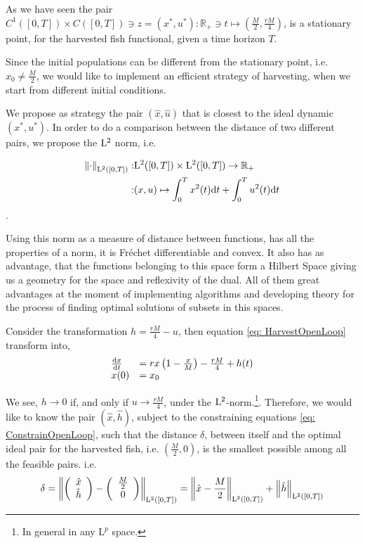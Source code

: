 As we have seen the pair $C^1([0,T])\times C([0,T]) \ni z=(x^*,u^*): \mathbb{R_+}\ni t \mapsto \left(\frac{M}{2}, \frac{rM}{4}\right)$, is a stationary point, for the harvested fish functional, given a time horizon $T$. 

Since the initial populations can be different from the stationary point, i.e. $x_0\neq\frac{M}{2}$, we would like to implement an efficient strategy of harvesting, when we start from different initial conditions.

We propose as strategy the pair $(\hat{x}, \hat{u})$ that is closest to the ideal dynamic $(x^*, u^*)$. In order to do a comparison between the distance of two different pairs, we propose the $\mathrm{L}^2$ norm, i.e. 

\begin{align}
	\left\lVert \cdot \right\rVert_{\mathrm{L}^2([0,T])}:& \mathrm{L}^2([0,T])\times \mathrm{L}^2([0,T])\rightarrow \mathbb{R_+}\\
	:& (x, u)\mapsto \int_{0}^T x^2(t)\mathrm{d} t +\int_{0}^T u^2(t)\mathrm{d} t	
\end{align}. 

Using this norm as a measure of distance between functions, has all the properties of a norm, it is Fr\'echet differentiable and convex. It also has as advantage, that the functions belonging to this space form a Hilbert Space giving us a geometry for the space and reflexivity of the dual. All of them great advantages at the moment of implementing algorithms and developing theory for the process of finding optimal solutions of subsets in this spaces.


Consider the transformation $h=\frac{rM}{4}-u$, then equation \ref{eq: HarvestOpenLoop} transform into,
\begin{align}
\begin{array}{ll}
	\frac{\mathrm{d} x}{{\mathrm{d} t}}&=rx\left(1-\frac{x}{M}\right)-\frac{rM}{4}+h(t) \\
	x(0)&=x_0
\end{array}
 \label{eq: ConstrainOpenLoop}
\end{align}

We see, $h \rightarrow 0$ if, and only if $u\rightarrow \frac{rM}{4}$, under the $\mathrm{L}^2$-norm.\footnote{In general in any $\mathrm{L}^p$ space.}.  Therefore, we would like to know the pair $(\hat{x}, \hat{h})$, subject to the constraining equations \ref{eq: ConstrainOpenLoop}, such that the distance $\delta$, between itself and the optimal ideal pair for the harvested fish, i.e. $\left(\frac{M}{2}, 0\right)$, is the smallest possible among all the feasible pairs. i.e. 
\begin{equation}
\delta=	\left\lVert \left(\begin{array}{c}
			\hat{x} \\ \hat{h}
		\end{array}\right)-\left(\begin{array}{c} \frac{M}{2}\\ 0\end{array}\right) \right\rVert_{\mathrm{L}^2([0,T])}=\left\lVert \hat{x}-\frac{M}{2} \right\rVert_{\mathrm{L}^2([0,T])}+\left\lVert \hat{h} \right\rVert_{\mathrm{L}^2([0,T])}
\end{equation}

